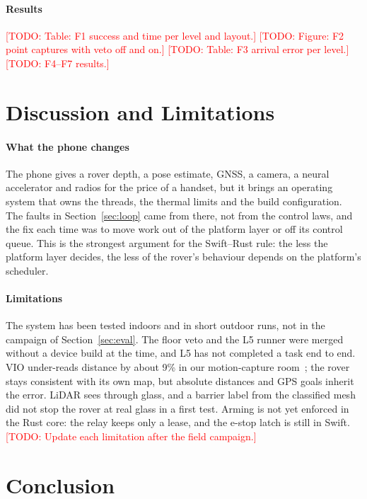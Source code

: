 \documentclass[conference]{IEEEtran}
\newcommand{\todo}[1]{\textcolor{red}{[TODO: #1]}}
\begin{document}
\paragraph{Results}
\todo{Table: F1 success and time per level and layout.}
\todo{Figure: F2 point captures with veto off and on.}
\todo{Table: F3 arrival error per level.}
\todo{F4--F7 results.}

\section{Discussion and Limitations}
\label{sec:discussion}

\paragraph{What the phone changes}
The phone gives a rover depth, a pose estimate, GNSS, a camera, a neural accelerator and radios for the price of a handset, but it brings an operating system that owns the threads, the thermal limits and the build configuration.
The faults in Section~\ref{sec:loop} came from there, not from the control laws, and the fix each time was to move work out of the platform layer or off its control queue.
This is the strongest argument for the Swift--Rust rule: the less the platform layer decides, the less of the rover's behaviour depends on the platform's scheduler.

\paragraph{Limitations}
The system has been tested indoors and in short outdoor runs, not in the campaign of Section~\ref{sec:eval}.
The floor veto and the L5 runner were merged without a device build at the time, and L5 has not completed a task end to end.
VIO under-reads distance by about 9\% in our motion-capture room~\cite{companion2026phone}; the rover stays consistent with its own map, but absolute distances and GPS goals inherit the error.
LiDAR sees through glass, and a barrier label from the classified mesh did not stop the rover at real glass in a first test.
Arming is not yet enforced in the Rust core: the relay keeps only a lease, and the e-stop latch is still in Swift.
\todo{Update each limitation after the field campaign.}

\section{Conclusion}
\label{sec:conclusion}
\end{document}
